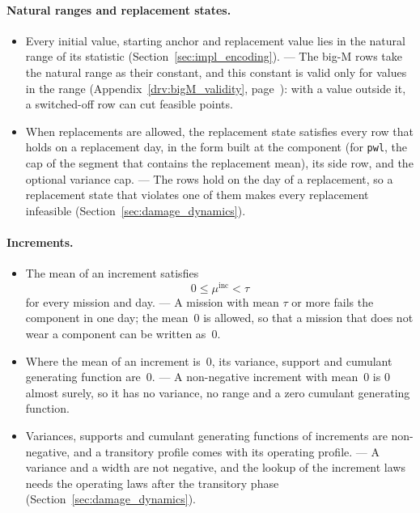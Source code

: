 \documentclass[11pt,a4paper]{article}
\theoremstyle{plain}
\theoremstyle{definition}
\theoremstyle{remark}
\begin{document}
\paragraph{Natural ranges and replacement states.}
\begin{itemize}
  \item Every initial value, starting anchor and replacement value lies in the natural range of its statistic (Section~\ref{sec:impl_encoding}). --- The big-M rows take the natural range as their constant, and this constant is valid only for values in the range (Appendix~\ref{drv:bigM_validity}, page~\pageref{drv:bigM_validity}): with a value outside it, a switched-off row can cut feasible points.
  \item When replacements are allowed, the replacement state satisfies every row that holds on a replacement day, in the form built at the component (for \texttt{pwl}, the cap of the segment that contains the replacement mean), its side row, and the optional variance cap. --- The rows hold on the day of a replacement, so a replacement state that violates one of them makes every replacement infeasible (Section~\ref{sec:damage_dynamics}).
\end{itemize}

\paragraph{Increments.}
\begin{itemize}
  \item The mean of an increment satisfies
    \begin{equation}
      0 \le \mu^{\mathrm{inc}} < \tau
    \end{equation}
    for every mission and day. --- A mission with mean $\tau$ or more fails the component in one day; the mean~$0$ is allowed, so that a mission that does not wear a component can be written as~$0$.
  \item Where the mean of an increment is~$0$, its variance, support and cumulant generating function are~$0$. --- A non-negative increment with mean~$0$ is $0$ almost surely, so it has no variance, no range and a zero cumulant generating function.
  \item Variances, supports and cumulant generating functions of increments are non-negative, and a transitory profile comes with its operating profile. --- A variance and a width are not negative, and the lookup of the increment laws needs the operating laws after the transitory phase (Section~\ref{sec:damage_dynamics}).
\end{itemize}
\end{document}
